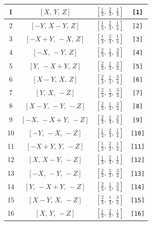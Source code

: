 \documentclass[fleqn,8pt]{jsarticle}
\begin{document}
\begin{longtable}{cccc}
1 & $\left[ X,\, Y,\, Z \right]$ & $\left[ \frac{1}{3},\, \frac{2}{3},\, \frac{1}{4} \right]$ & {\tt [1]} \\ \hline
2 & $\left[ - Y,\, X - Y,\, Z \right]$ & $\left[ \frac{1}{3},\, \frac{2}{3},\, \frac{1}{4} \right]$ & {\tt [2]} \\ \hline
3 & $\left[ - X + Y,\, - X,\, Z \right]$ & $\left[ \frac{1}{3},\, \frac{2}{3},\, \frac{1}{4} \right]$ & {\tt [3]} \\ \hline
4 & $\left[ - X,\, - Y,\, Z \right]$ & $\left[ \frac{2}{3},\, \frac{1}{3},\, \frac{3}{4} \right]$ & {\tt [4]} \\ \hline
5 & $\left[ Y,\, - X + Y,\, Z \right]$ & $\left[ \frac{2}{3},\, \frac{1}{3},\, \frac{3}{4} \right]$ & {\tt [5]} \\ \hline
6 & $\left[ X - Y,\, X,\, Z \right]$ & $\left[ \frac{2}{3},\, \frac{1}{3},\, \frac{3}{4} \right]$ & {\tt [6]} \\ \hline
7 & $\left[ Y,\, X,\, - Z \right]$ & $\left[ \frac{2}{3},\, \frac{1}{3},\, \frac{3}{4} \right]$ & {\tt [7]} \\ \hline
8 & $\left[ X - Y,\, - Y,\, - Z \right]$ & $\left[ \frac{2}{3},\, \frac{1}{3},\, \frac{3}{4} \right]$ & {\tt [8]} \\ \hline
9 & $\left[ - X,\, - X + Y,\, - Z \right]$ & $\left[ \frac{2}{3},\, \frac{1}{3},\, \frac{3}{4} \right]$ & {\tt [9]} \\ \hline
10 & $\left[ - Y,\, - X,\, - Z \right]$ & $\left[ \frac{1}{3},\, \frac{2}{3},\, \frac{1}{4} \right]$ & {\tt [10]} \\ \hline
11 & $\left[ - X + Y,\, Y,\, - Z \right]$ & $\left[ \frac{1}{3},\, \frac{2}{3},\, \frac{1}{4} \right]$ & {\tt [11]} \\ \hline
12 & $\left[ X,\, X - Y,\, - Z \right]$ & $\left[ \frac{1}{3},\, \frac{2}{3},\, \frac{1}{4} \right]$ & {\tt [12]} \\ \hline
13 & $\left[ - X,\, - Y,\, - Z \right]$ & $\left[ \frac{2}{3},\, \frac{1}{3},\, \frac{3}{4} \right]$ & {\tt [13]} \\ \hline
14 & $\left[ Y,\, - X + Y,\, - Z \right]$ & $\left[ \frac{2}{3},\, \frac{1}{3},\, \frac{3}{4} \right]$ & {\tt [14]} \\ \hline
15 & $\left[ X - Y,\, X,\, - Z \right]$ & $\left[ \frac{2}{3},\, \frac{1}{3},\, \frac{3}{4} \right]$ & {\tt [15]} \\ \hline
16 & $\left[ X,\, Y,\, - Z \right]$ & $\left[ \frac{1}{3},\, \frac{2}{3},\, \frac{1}{4} \right]$ & {\tt [16]} \\ \hline

\end{longtable}
\end{document}
